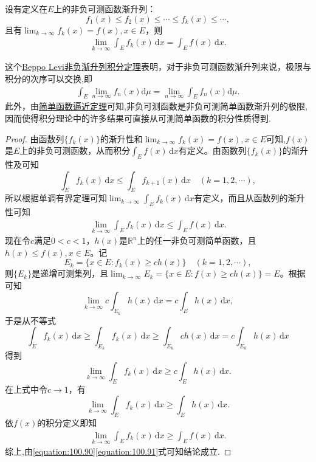 \documentclass[../../main.tex]{subfiles}%
\begin{document}
\begin{theorem}\label{theorem:Beppo Levi非负渐升列积分定理}
设有定义在$E$上的非负可测函数渐升列：
\[
f_1(x) \leqslant f_2(x) \leqslant \cdots \leqslant f_k(x) \leqslant \cdots,
\]
且有$\lim_{k \to \infty} f_k(x) = f(x), x \in E$，则
\begin{align*}
\lim_{k \to \infty} \int_E f_k(x) \, \mathrm{d}x = \int_E f(x) \, \mathrm{d}x. 
\end{align*}
\end{theorem}
\begin{note}
这个\hyperref[theorem:Beppo Levi非负渐升列积分定理]{Beppo Levi非负渐升列积分定理}表明，对于非负可测函数渐升列来说，极限与积分的次序可以交换,即
\begin{align*}
\int_E \lim_{n \to \infty} f_n(x) \mathrm{d}\mu = \lim_{n \to \infty} \int_E f_n(x) \mathrm{d}\mu .
\end{align*}
此外，由\hyperref[theorem:简单函数逼近定理]{简单函数逼近定理}可知,非负可测函数是非负可测简单函数渐升列的极限,因而使得积分理论中的许多结果可直接从可测简单函数的积分性质得到.
\end{note}
\begin{proof}

由函数列$\{f_k(x)\}$的渐升性和$\lim_{k \to \infty} f_k(x) = f(x), x \in E$可知,$f(x)$是$E$上的非负可测函数，从而积分$\int_E f(x) \, \mathrm{d}x$有定义。由函数列$\{f_k(x)\}$的渐升性及可知
\[
\int_E f_k(x) \, \mathrm{d}x \leqslant \int_E f_{k + 1}(x) \, \mathrm{d}x \quad (k = 1,2,\cdots),
\]
所以根据单调有界定理可知$\lim_{k \to \infty} \int_E f_k(x) \, \mathrm{d}x$有定义，而且从函数列的渐升性可知
\begin{align}\label{equation:100.90}
\lim_{k \to \infty} \int_E f_k(x) \, \mathrm{d}x \leqslant \int_E f(x) \, \mathrm{d}x.
\end{align}
现在令$c$满足$0 < c < 1$，$h(x)$是$\mathbb{R}^n$上的任一非负可测简单函数，且$h(x) \leqslant f(x), x \in E$。记
\[
E_k = \{x \in E: f_k(x) \geqslant ch(x)\} \quad (k = 1,2,\cdots),
\]
则$\{E_k\}$是递增可测集列，且$\lim_{k \to \infty} E_k = \{x\in E:f(x)\geqslant ch(x)\}=E$。根据可知
\[
\lim_{k \to \infty} c \int_{E_k} h(x) \, \mathrm{d}x = c \int_E h(x) \, \mathrm{d}x,
\]
于是从不等式
\[
\int_E f_k(x) \, \mathrm{d}x \geqslant \int_{E_k} f_k(x) \, \mathrm{d}x \geqslant \int_{E_k} ch(x) \, \mathrm{d}x = c \int_{E_k} h(x) \, \mathrm{d}x
\]
得到
\[
\lim_{k \to \infty} \int_E f_k(x) \, \mathrm{d}x \geqslant c \int_E h(x) \, \mathrm{d}x.
\]
在上式中令$c \to 1$，有
\[
\lim_{k \to \infty} \int_E f_k(x) \, \mathrm{d}x \geqslant \int_E h(x) \, \mathrm{d}x.
\]
依$f(x)$的积分定义即知
\begin{align}\label{equation:100.91}
\lim_{k \to \infty} \int_E f_k(x) \, \mathrm{d}x \geqslant \int_E f(x) \, \mathrm{d}x.
\end{align}
综上,由\eqref{equation:100.90}\eqref{equation:100.91}式可知结论成立.

\end{proof}
\end{document}
